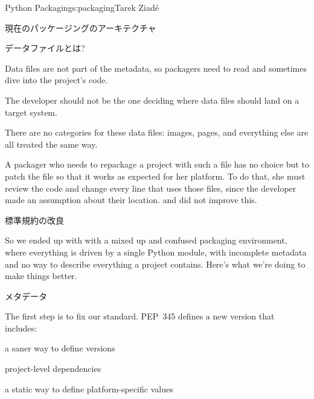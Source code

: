 \begin{aosachapter}{Python Packaging}{s:packaging}{Tarek Ziad\'{e}}
\begin{aosasect1}{現在のパッケージングのアーキテクチャ}
\begin{aosasect2}{データファイルとは?}
\begin{aosaitemize}

  \item Data files are not part of the metadata, so packagers need to read
   and sometimes dive into the project's code.

  \item The developer should not be the one deciding where data files
  should land on a target system.

  \item There are no categories for these data files: images, 
  pages, and everything else are all treated the same way.

\end{aosaitemize}

A packager who needs to repackage a project with such a file has no
choice but to patch the  file so that it works as
expected for her platform.  To do that, she must review the code
and change every line that uses those files, since the developer made
an assumption about their location.   and 
did not improve this.

\end{aosasect2}

\end{aosasect1}

\begin{aosasect1}{標準規約の改良}

So we ended up with with a mixed up and confused packaging
environment, where everything is driven by a single Python module,
with incomplete metadata and no way to describe everything a project
contains.  Here's what we're doing to make things better.

\begin{aosasect2}{メタデータ}

The first step is to fix our  standard.  PEP~345
defines a new version that includes:

\begin{aosaitemize}

  \item a saner way to define versions

  \item project-level dependencies

  \item a static way to define platform-specific values


\end{aosaitemize}
\end{aosasect2}
\end{aosasect1}
\end{aosachapter}
